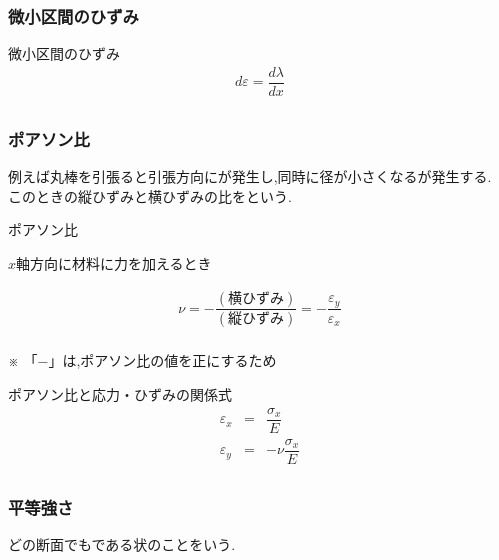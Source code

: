 \documentclass[a4paper]{jsarticle}
\begin{document}
\subsubsection{微小区間のひずみ}
\begin{itembox}[l]{微小区間のひずみ}
    \begin{eqnarray*}
        d\varepsilon=\dfrac{d\lambda}{dx}\\
    \end{eqnarray*}
\end{itembox}
\subsubsection{ポアソン比}
例えば丸棒を引張ると引張方向にが発生し,同時に径が小さくなるが発生する.\\
このときの縦ひずみと横ひずみの比をという.
\begin{itembox}[l]{ポアソン比}
    \begin{center}
        $x$軸方向に材料に力を加えるとき
    \end{center}
    \begin{eqnarray*}
        \nu=-\dfrac{\left(横ひずみ\right)}{\left(縦ひずみ\right)}=-\dfrac{\varepsilon_y}{\varepsilon_x}\\
    \end{eqnarray*}
    \begin{center}
        ※ 「$-$」は,ポアソン比の値を正にするため
    \end{center}
\end{itembox}
\begin{itembox}[l]{ポアソン比と応力・ひずみの関係式}
    \begin{eqnarray*}
        \varepsilon_x&=&\dfrac{\sigma_x}{E}\\
        \varepsilon_y&=&-\nu\dfrac{\sigma_x}{E}\\
    \end{eqnarray*}
\end{itembox}
\subsubsection{平等強さ}
どの断面でもである状のことをいう.
\end{document}
